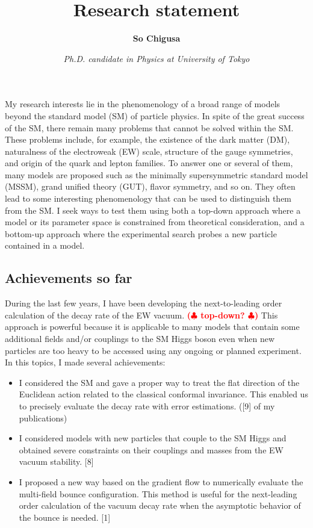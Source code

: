 \documentclass[12pt,notitlepage]{article}
\title{\vspace*{-3cm}Research statement}
\author{\textbf{So Chigusa}}
\date{\vspace*{-4mm}\textit{Ph.D. candidate in Physics at University of Tokyo}}
\def\rem#1{ {\bf\textcolor{red}{($\clubsuit$ #1 $\clubsuit$)}}}
\begin{document}
\maketitle

My research interests lie in the phenomenology of a broad range of models beyond the standard model (SM) of particle physics.
In spite of the great success of the SM, there remain many problems that cannot be solved within the SM.
These problems include, for example, the existence of the dark matter (DM), naturalness of the electroweak (EW) scale, structure of the gauge symmetries, and origin of the quark and lepton families.
To answer one or several of them, many models are proposed such as the minimally supersymmetric standard model (MSSM), grand unified theory (GUT), flavor symmetry, and so on.
They often lead to some interesting phenomenology that can be used to distinguish them from the SM.
I seek ways to test them using both a top-down approach where a model or its parameter space is constrained from theoretical consideration, and a bottom-up approach where the experimental search probes a new particle contained in a model.

\vspace*{-2mm}
\subsection*{Achievements so far}

During the last few years, I have been developing the next-to-leading order calculation of the decay rate of the EW vacuum.
\rem{top-down?}
This approach is powerful because it is applicable to many models that contain some additional fields and/or couplings to the SM Higgs boson even when new particles are too heavy to be accessed using any ongoing or planned experiment.
In this topics, I made several achievements:
\begin{itemize}
  \item
    I considered the SM and gave a proper way to treat the flat direction of the Euclidean action related to the classical conformal invariance.
    This enabled us to precisely evaluate the decay rate with error estimations. ([9] of my publications)
  \item
    I considered models with new particles that couple to the SM Higgs and obtained severe constraints on their couplings and masses from the EW vacuum stability. [8]
  \item
    I proposed a new way based on the gradient flow to numerically evaluate the multi-field bounce configuration.
    This method is useful for the next-leading order calculation of the vacuum decay rate when the asymptotic behavior of the bounce is needed. [1]
\end{itemize}
\end{document}
